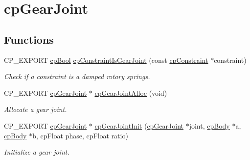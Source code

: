 \hypertarget{group__cpGearJoint}{}\section{cp\+Gear\+Joint}
\label{group__cpGearJoint}
\subsection*{Functions}
\begin{DoxyCompactItemize}
\item 
\mbox{\label{group__cpGearJoint_gac129589a0c7775d8ca30f0448bed620a}} 
C\+P\+\_\+\+E\+X\+P\+O\+RT \hyperlink{group__basicTypes_gabc5e752c48f3449ca26ef413ecbd647e}{cp\+Bool} \hyperlink{group__cpGearJoint_gac129589a0c7775d8ca30f0448bed620a}{cp\+Constraint\+Is\+Gear\+Joint} (const \hyperlink{structcpConstraint}{cp\+Constraint} $\ast$constraint)
\begin{DoxyCompactList}\small\item\em Check if a constraint is a damped rotary springs. \end{DoxyCompactList}\item 
\mbox{\label{group__cpGearJoint_gaf6836c4becdec4d14ab0fc4503d422ca}} 
C\+P\+\_\+\+E\+X\+P\+O\+RT \hyperlink{structcpGearJoint}{cp\+Gear\+Joint} $\ast$ \hyperlink{group__cpGearJoint_gaf6836c4becdec4d14ab0fc4503d422ca}{cp\+Gear\+Joint\+Alloc} (void)
\begin{DoxyCompactList}\small\item\em Allocate a gear joint. \end{DoxyCompactList}\item 
\mbox{\label{group__cpGearJoint_gaf6fe1b82ec2f2e984be7da98647f2347}} 
C\+P\+\_\+\+E\+X\+P\+O\+RT \hyperlink{structcpGearJoint}{cp\+Gear\+Joint} $\ast$ \hyperlink{group__cpGearJoint_gaf6fe1b82ec2f2e984be7da98647f2347}{cp\+Gear\+Joint\+Init} (\hyperlink{structcpGearJoint}{cp\+Gear\+Joint} $\ast$joint, \hyperlink{structcpBody}{cp\+Body} $\ast$a, \hyperlink{structcpBody}{cp\+Body} $\ast$b, cp\+Float phase, cp\+Float ratio)
\begin{DoxyCompactList}\small\item\em Initialize a gear joint. \end{DoxyCompactList}\item 
\mbox{\label{group__cpGearJoint_ga5da02bb929c46c9c9aadfc6b2952a75e}} 

\end{DoxyCompactItemize}

